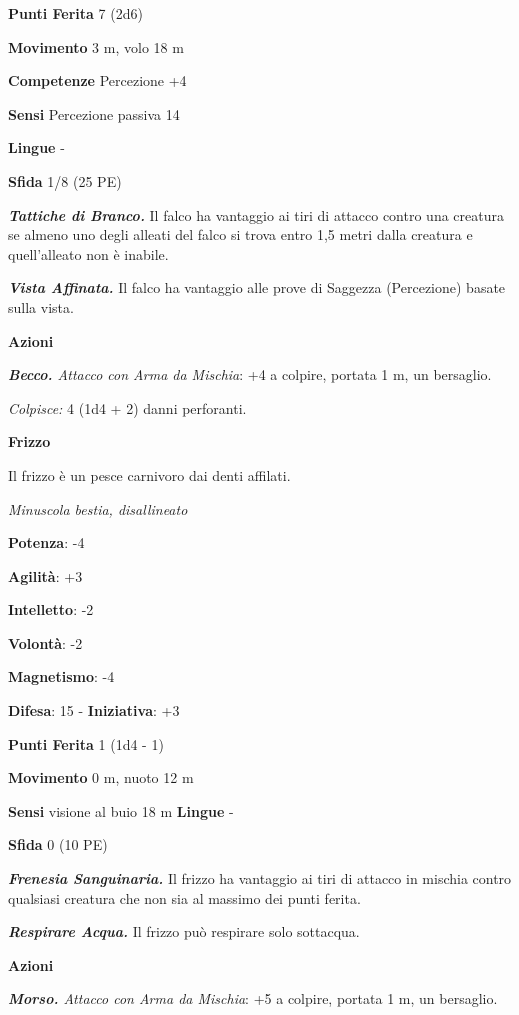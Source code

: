 \begin{multicols}{2}
\textbf{Punti Ferita} 7 (2d6)

\textbf{Movimento} 3 m, volo 18 m

\textbf{Competenze} Percezione +4

\textbf{Sensi} Percezione passiva 14

\textbf{Lingue} -

\textbf{Sfida} 1/8 (25 PE)\smallskip

\emph{\textbf{Tattiche di Branco.}} Il falco ha vantaggio ai tiri di
attacco contro una creatura se almeno uno degli alleati del falco si
trova entro 1,5 metri dalla creatura e quell'alleato non è inabile.

\emph{\textbf{Vista Affinata.}} Il falco ha vantaggio alle prove di
Saggezza (Percezione) basate sulla vista.

\smallskip\textbf{Azioni}

\emph{\textbf{Becco.} Attacco con Arma da Mischia}: +4 a colpire,
portata 1 m, un bersaglio.

\emph{Colpisce:} 4 (1d4 + 2) danni perforanti.



\textbf{Frizzo}

Il frizzo è un pesce carnivoro dai denti affilati.

\emph{Minuscola bestia, disallineato}

\textbf{Potenza}: -4

\textbf{Agilità}: +3

\textbf{Intelletto}: -2

\textbf{Volontà}: -2

\textbf{Magnetismo}: -4

\textbf{Difesa}: 15 - \textbf{Iniziativa}: +3

\textbf{Punti Ferita} 1 (1d4 - 1)

\textbf{Movimento} 0 m, nuoto 12 m

\textbf{Sensi} visione al buio 18 m
\textbf{Lingue} -

\textbf{Sfida} 0 (10 PE)\smallskip

\emph{\textbf{Frenesia Sanguinaria.}} Il frizzo ha vantaggio ai tiri di
attacco in mischia contro qualsiasi creatura che non sia al massimo dei
punti ferita.

\emph{\textbf{Respirare Acqua.}} Il frizzo può respirare solo sottacqua.

\smallskip\textbf{Azioni}

\emph{\textbf{Morso.} Attacco con Arma da Mischia}: +5 a colpire,
portata 1 m, un bersaglio.


\end{multicols}
